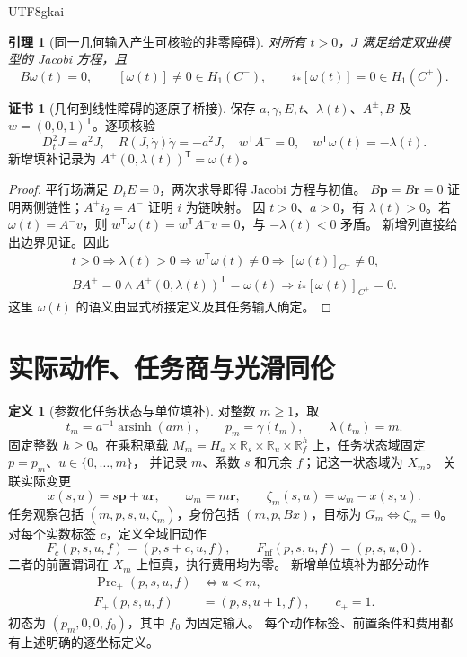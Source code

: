 \documentclass[12pt,a4paper,openany,notitlepage]{report}
\theoremstyle{plain}
\newtheorem{lemma}[theorem]{引理}
\theoremstyle{definition}
\newtheorem{definition}[theorem]{定义}
\newtheorem*{certificate}{证书}
\theoremstyle{remark}
\begin{document}
\begin{CJK*}{UTF8}{gkai}
\begin{lemma}[同一几何输入产生可核验的非零障碍]
\label{hgov:lem:jointobstruction}
对所有 $t>0$，$J$ 满足给定双曲模型的 Jacobi 方程，且
\[
B\omega(t)=0,\qquad
[\omega(t)]\ne0\in H_1(C^-),\qquad
i_*[\omega(t)]=0\in H_1(C^+).
\]
\end{lemma}
\begin{certificate}[几何到线性障碍的逐原子桥接]
保存 $a,\gamma,E,t$、$\lambda(t)$、$A^\pm,B$ 及
$w=(0,0,1)^{\mathsf T}$。逐项核验
\[
D_t^2J=a^2J,\quad R(J,\dot\gamma)\dot\gamma=-a^2J,\quad
w^{\mathsf T}A^-=0,\quad
w^{\mathsf T}\omega(t)=-\lambda(t).
\]
新增填补记录为 $A^+(0,\lambda(t))^{\mathsf T}=\omega(t)$。
\end{certificate}
\begin{proof}
平行场满足 $D_tE=0$，两次求导即得 Jacobi 方程与初值。
$B\mathbf p=B\mathbf r=0$ 证明两侧链性；$A^+i_2=A^-$ 证明 $i$ 为链映射。
因 $t>0$、$a>0$，有 $\lambda(t)>0$。若 $\omega(t)=A^-v$，则
$w^{\mathsf T}\omega(t)=w^{\mathsf T}A^-v=0$，与 $-\lambda(t)<0$ 矛盾。
新增列直接给出边界见证。因此
\[
\begin{gathered}
t>0\Rightarrow\lambda(t)>0
\Rightarrow w^{\mathsf T}\omega(t)\ne0
\Rightarrow[\omega(t)]_{C^-}\ne0,\\
B A^+=0\land A^+(0,\lambda(t))^{\mathsf T}=\omega(t)
\Rightarrow i_*[\omega(t)]_{C^+}=0 .
\end{gathered}
\]
这里 $\omega(t)$ 的语义由显式桥接定义及其任务输入确定。
\end{proof}

\section{实际动作、任务商与光滑同伦}

\begin{definition}[参数化任务状态与单位填补]
\label{hgov:def:jointtask}
对整数 $m\ge1$，取
\[
t_m=a^{-1}\operatorname{arsinh}(am),\qquad p_m=\gamma(t_m),
\qquad \lambda(t_m)=m .
\]
固定整数 $h\ge0$。在乘积承载
$M_m=H_a\times\mathbb R_s\times\mathbb R_u\times\mathbb R_f^h$
上，任务状态域固定 $p=p_m$、$u\in\{0,\ldots,m\}$，
并记录 $m$、系数 $s$ 和冗余 $f$；记这一状态域为 $X_m$。
关联实际变更
\[
x(s,u)=s\mathbf p+u\mathbf r,\qquad
\omega_m=m\mathbf r,\qquad
\zeta_m(s,u)=\omega_m-x(s,u).
\]
任务观察包括 $(m,p,s,u,\zeta_m)$，身份包括 $(m,p,Bx)$，目标为
$G_m\iff \zeta_m=0$。对每个实数标签 $c$，定义全域旧动作
\[
 F_c(p,s,u,f)=(p,s+c,u,f),\qquad
 F_{\mathrm{nf}}(p,s,u,f)=(p,s,u,0).
\]
二者的前置谓词在 $X_m$ 上恒真，执行费用均为零。
新增单位填补为部分动作
\[
 \begin{aligned}
 \operatorname{Pre}_+(p,s,u,f)&\iff u<m,\\
 F_+(p,s,u,f)&=(p,s,u+1,f),\qquad c_+=1.
 \end{aligned}
\]
初态为 $(p_m,0,0,f_0)$，其中 $f_0$ 为固定输入。
每个动作标签、前置条件和费用都有上述明确的逐坐标定义。
\end{definition}


\end{CJK*}
\end{document}
